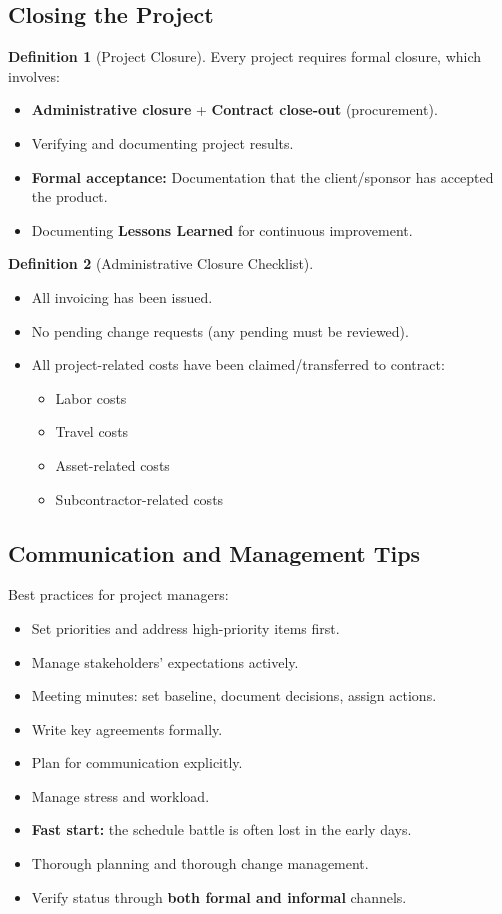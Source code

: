 \documentclass[11pt,a4paper]{article}
\theoremstyle{definition}
\newtheorem{definition}{Definition}[section]
\theoremstyle{plain}
\begin{document}
\subsection{Closing the Project}

\begin{definition}[Project Closure]
Every project requires formal closure, which involves:
\begin{itemize}[nosep]
  \item \textbf{Administrative closure} + \textbf{Contract close-out} (procurement).
  \item Verifying and documenting project results.
  \item \textbf{Formal acceptance:} Documentation that the client/sponsor has accepted the product.
  \item Documenting \textbf{Lessons Learned} for continuous improvement.
\end{itemize}
\end{definition}

\begin{definition}[Administrative Closure Checklist]
\begin{itemize}[nosep]
  \item All invoicing has been issued.
  \item No pending change requests (any pending must be reviewed).
  \item All project-related costs have been claimed/transferred to contract:
  \begin{itemize}[nosep]
    \item Labor costs
    \item Travel costs
    \item Asset-related costs
    \item Subcontractor-related costs
  \end{itemize}
\end{itemize}
\end{definition}

\subsection{Communication and Management Tips}

Best practices for project managers:
\begin{itemize}[nosep]
  \item Set priorities and address high-priority items first.
  \item Manage stakeholders' expectations actively.
  \item Meeting minutes: set baseline, document decisions, assign actions.
  \item Write key agreements formally.
  \item Plan for communication explicitly.
  \item Manage stress and workload.
  \item \textbf{Fast start:} the schedule battle is often lost in the early days.
  \item Thorough planning and thorough change management.
  \item Verify status through \textbf{both formal and informal} channels.
\end{itemize}
\end{document}
